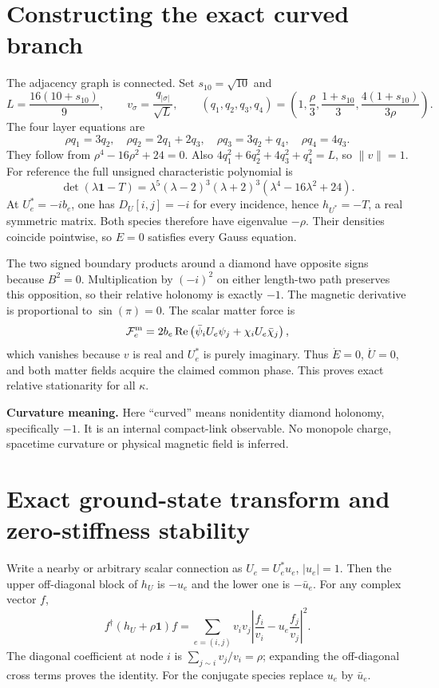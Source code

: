 \documentclass[11pt,a4paper]{article}
\newcommand{\id}{\mathbf1}\newcommand{\tr}{\operatorname{tr}}\newcommand{\diag}{\operatorname{diag}}\newcommand{\Rea}{\operatorname{Re}}
\begin{document}
\newpage
\section{Constructing the exact curved branch}
The adjacency graph is connected. Set $s_{10}=\sqrt{10}$ and
\[
L=\frac{16(10+s_{10})}{9},\qquad
v_\sigma=\frac{q_{|\sigma|}}{\sqrt L},\qquad
(q_1,q_2,q_3,q_4)=
\left(1,\frac\rho3,\frac{1+s_{10}}3,
\frac{4(1+s_{10})}{3\rho}\right).
\]
The four layer equations are
\[
\rho q_1=3q_2,\quad\rho q_2=2q_1+2q_3,\quad
\rho q_3=3q_2+q_4,\quad\rho q_4=4q_3.
\]
They follow from $\rho^4-16\rho^2+24=0$. Also
$4q_1^2+6q_2^2+4q_3^2+q_4^2=L$, so $\|v\|=1$.
For reference the full unsigned characteristic polynomial is
\[
\det(\lambda\id-T)=\lambda^5(\lambda-2)^3(\lambda+2)^3
(\lambda^4-16\lambda^2+24).
\]
At $U_e^*=-ib_e$, one has $D_U[i,j]=-i$ for every incidence, hence $h_{U^*}=-T$, a real symmetric matrix. Both species therefore have eigenvalue $-\rho$. Their densities coincide pointwise, so $E=0$ satisfies every Gauss equation.

The two signed boundary products around a diamond have opposite signs because $B^2=0$. Multiplication by $(-i)^2$ on either length-two path preserves this opposition, so their relative holonomy is exactly $-1$. The magnetic derivative is proportional to $\sin(\pi)=0$. The scalar matter force is
\[
\mathcal F_e^{\rm m}=2b_e\Rea\left(
\bar\psi_iU_e\psi_j+\chi_iU_e\bar\chi_j\right),
\]
which vanishes because $v$ is real and $U_e^*$ is purely imaginary. Thus $\dot E=0$, $\dot U=0$, and both matter fields acquire the claimed common phase. This proves exact relative stationarity for all $\kappa$.

\textbf{Curvature meaning.} Here ``curved'' means nonidentity diamond holonomy, specifically $-1$. It is an internal compact-link observable. No monopole charge, spacetime curvature or physical magnetic field is inferred.

\newpage
\section{Exact ground-state transform and zero-stiffness stability}
Write a nearby or arbitrary scalar connection as $U_e=U_e^*u_e$, $|u_e|=1$. Then the upper off-diagonal block of $h_U$ is $-u_e$ and the lower one is $-\bar u_e$. For any complex vector $f$,
\begin{equation}
f^\dagger(h_U+\rho\id)f
=\sum_{e=(i,j)}v_iv_j\left|\frac{f_i}{v_i}-u_e\frac{f_j}{v_j}\right|^2.
\label{eq:transform}
\end{equation}
The diagonal coefficient at node $i$ is
$\sum_{j\sim i}v_j/v_i=\rho$; expanding the off-diagonal cross terms proves the identity. For the conjugate species replace $u_e$ by $\bar u_e$.
\end{document}
